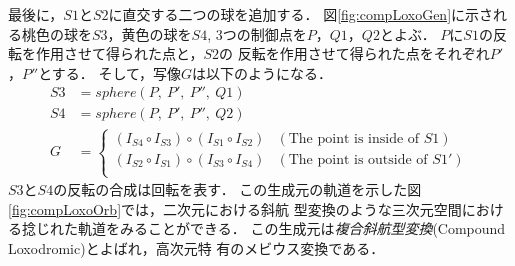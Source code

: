 最後に，$S1$と$S2$に直交する二つの球を追加する．
図\ref{fig:compLoxoGen}に示される桃色の球を$S3$，黄色の球を$S4$,
3つの制御点を$P，Q1，Q2$とよぶ．
$P$に$S1$の反転を作用させて得られた点と，$S2$の
反転を作用させて得られた点をそれぞれ$P'$，$P''$とする．
そして，写像$G$は以下のようになる．
\begin{align*}
S3 &= sphere(P,~P',~P'',~Q1) \\
S4 &= sphere(P,~P',~P'',~Q2) \\
G &=
\begin{cases}
 (I_{S4} \circ I_{S3}) \circ (I_{S1} \circ I_{S2}) & (\text{The point is inside of } S1) \\
 (I_{S2} \circ I_{S1}) \circ (I_{S3} \circ I_{S4}) & (\text{The point is
 outside of } S1')\\
\end{cases}
\end{align*}
$S3$と$S4$の反転の合成は回転を表す．
この生成元の軌道を示した図\ref{fig:compLoxoOrb}では，二次元における斜航
型変換のような三次元空間における捻じれた軌道をみることができる．
この生成元は\emph{複合斜航型変換}(Compound Loxodromic)とよばれ，高次元特
有のメビウス変換である．

